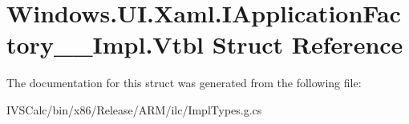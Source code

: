 \hypertarget{struct_windows_1_1_u_i_1_1_xaml_1_1_i_application_factory_____impl_1_1_vtbl}{}\section{Windows.\+U\+I.\+Xaml.\+I\+Application\+Factory\+\_\+\+\_\+\+Impl.\+Vtbl Struct Reference}
\label{struct_windows_1_1_u_i_1_1_xaml_1_1_i_application_factory_____impl_1_1_vtbl}


The documentation for this struct was generated from the following file\+:\begin{DoxyCompactItemize}
\item 
I\+V\+S\+Calc/bin/x86/\+Release/\+A\+R\+M/ilc/Impl\+Types.\+g.\+cs\end{DoxyCompactItemize}
